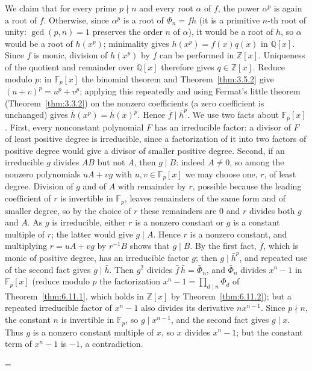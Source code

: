 \documentclass[11pt]{article}
\makeatletter
\theoremstyle{ntstyle}
\let\nt@closedisplay\]
\def\nt@guardedclose{\@ifnextchar\par{\nt@closeafterpar}{\@ifnextchar\end{\postdisplaypenalty\@M\nt@closedisplay}{\nt@closedisplay}}}
\def\nt@closeafterpar\par{\@ifnextchar\par{\nt@closeafterpar}{\@ifnextchar\end{\postdisplaypenalty\@M\nt@closedisplay\par}{\nt@closedisplay\par}}}
\renewenvironment{proof}[1][\proofname]{\par
  \pushQED{\qed}\normalfont\topsep\medskipamount\edef\nt@afterproof{\@endparpenalty=\the\@endparpenalty\relax}\@beginparpenalty\@M\@endparpenalty\@M\let\]\nt@guardedclose\trivlist\item[]\textit{#1\@addpunct{.}} \ignorespaces}{\ifvmode\addpenalty\@M\fi\popQED\nt@afterproof\endtrivlist\@endpefalse}
\makeatother
\begin{document}
\begin{proof}
	We claim that for every prime $p\nmid n$ and every root $\alpha$ of $f$,
	the power $\alpha^{p}$ is again a root of $f$. Otherwise, since $\alpha^{p}$ is a
	root of $\Phi_n = fh$ (it is a primitive $n$-th root of unity:
	$\gcd(p, n) = 1$ preserves the order $n$ of $\alpha$), it would be a
	root of $h$, so $\alpha$ would be a root of $h(x^{p})$; minimality
	gives $h(x^{p})=f(x)q(x)$ in $\mathbb{Q}[x]$. Since $f$ is monic,
	division of $h(x^p)$ by $f$ can be performed in $\mathbb{Z}[x]$.
	Uniqueness of the quotient and remainder over $\mathbb{Q}[x]$ therefore
	gives $q\in\mathbb{Z}[x]$. Reduce modulo $p$:
	in $\mathbb{F}_p[x]$ the binomial theorem and
	Theorem~\ref{thm:3.5.2} give $(u+v)^p=u^p+v^p$; applying this repeatedly
	and using Fermat's little theorem (Theorem~\ref{thm:3.3.2}) on the nonzero
	coefficients (a zero coefficient is unchanged) gives $\bar h(x^{p}) = \bar h(x)^{p}$. Hence
	$\bar f\mid\bar h^{p}$. We use two facts about $\mathbb{F}_p[x]$.
	First, every nonconstant polynomial $F$ has an irreducible factor: a
	divisor of $F$ of least positive degree is irreducible, since a
	factorization of it into two factors of positive degree would give a
	divisor of smaller positive degree. Second, if an irreducible $g$
	divides $AB$ but not $A$, then $g\mid B$: indeed $A\neq0$, so among the
	nonzero polynomials $uA+vg$ with $u,v\in\mathbb{F}_p[x]$ we may choose
	one, $r$, of least degree. Division of $g$ and of $A$ with remainder by $r$, possible
	because the leading coefficient of $r$ is invertible in $\mathbb{F}_p$,
	leaves remainders of the same form and of smaller degree, so by the
	choice of $r$ these remainders are $0$ and $r$ divides both $g$ and $A$. As $g$ is
	irreducible, either $r$ is a nonzero constant or $g$ is a constant
	multiple of $r$; the latter would give $g\mid A$. Hence $r$ is a nonzero
	constant, and multiplying $r=uA+vg$ by $r^{-1}B$ shows that
	$g\mid B$. By the first fact, $\bar f$, which is monic of positive
	degree, has an irreducible factor $g$; then $g\mid\bar h^{p}$, and
	repeated use of the second fact gives $g\mid\bar h$. Then $g^2$
	divides $\bar f\,\bar h = \bar\Phi_n$, and $\bar\Phi_n$ divides $x^{n} - 1$ in
	$\mathbb{F}_p[x]$ (reduce modulo $p$ the factorization $x^n-1=\prod_{d\mid n}\Phi_d$ of
	Theorem~\ref{thm:6.11.1}, which holds in $\mathbb{Z}[x]$ by Theorem~\ref{thm:6.11.2}); but a
	repeated irreducible factor of $x^{n} - 1$
	also divides its derivative $nx^{n-1}$. Since $p\nmid n$, the constant
	$n$ is invertible in $\mathbb{F}_p$, so $g\mid x^{n-1}$, and the second
	fact gives $g\mid x$. Thus $g$ is a nonzero constant multiple of $x$,
	so $x$ divides $x^n-1$; but the constant
	term of $x^n-1$ is $-1$, a contradiction.


\end{proof}
\end{document}
